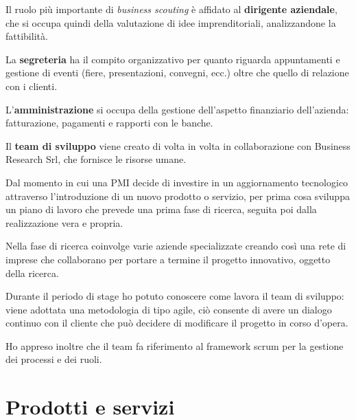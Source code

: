 \noindent Il ruolo più importante di \textit{business scouting} è affidato al \textbf{dirigente aziendale}, che si occupa quindi della valutazione di idee imprenditoriali, analizzandone la fattibilità.

\noindent La \textbf{segreteria} ha il compito organizzativo per quanto riguarda appuntamenti e gestione di eventi (fiere, presentazioni, convegni, ecc.) oltre che quello di relazione con i clienti.

\noindent L'\textbf{amministrazione} si occupa della gestione dell'aspetto finanziario dell'azienda: fatturazione, pagamenti e rapporti con le banche.

\noindent Il \textbf{team di sviluppo} viene creato di volta in volta in collaborazione con Business Research Srl, che fornisce le risorse umane.

\medskip

\noindent Dal momento in cui una PMI decide di investire in un aggiornamento tecnologico attraverso l'introduzione di un nuovo prodotto o servizio, \lab{} per prima cosa sviluppa un piano di lavoro che prevede una prima fase di ricerca, seguita poi dalla realizzazione vera e propria.

\noindent Nella fase di ricerca \lab{} coinvolge varie aziende specializzate creando così una rete di imprese che collaborano per portare a termine il progetto innovativo, oggetto della ricerca.

\medskip

\noindent Durante il periodo di stage ho potuto conoscere come lavora il team di sviluppo: viene adottata una metodologia di tipo agile, ciò consente di avere un dialogo continuo con il cliente che può decidere di modificare il progetto in corso d'opera.

\noindent Ho appreso inoltre che il team fa riferimento al framework scrum per la gestione dei processi e dei ruoli.

\section{Prodotti e servizi}
